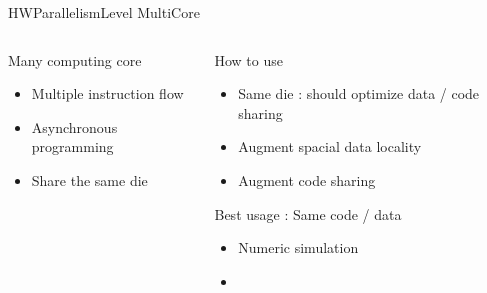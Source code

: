 %
\begin{Frame}{HWParallelismLevel MultiCore}
  \begin{columns}[t]
    \begin{column}{5cm} %
      \begin{block}{Many computing core}
        \begin{itemize}
        \item Multiple instruction flow
        \item Asynchronous programming
        \item Share the same die
        \end{itemize}
      \end{block} 
    \end{column}
    
    \begin{column}{5cm} %
      \begin{block}{How to use}
        \begin{itemize}
        \item Same die : should optimize data / code sharing
        \item Augment spacial data locality
        \item Augment code sharing
        \end{itemize}
      \end{block}   
      \begin{alertblock}{Best usage : Same code / data}
        \begin{itemize}
        \item Numeric simulation
        \item 
        \end{itemize}
      \end{alertblock}   
    \end{column}
  \end{columns}  
\end{Frame}


